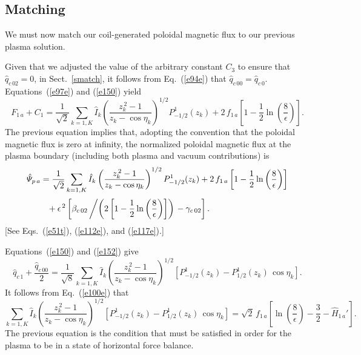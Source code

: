 \documentclass[12pt,prb,aps]{revtex4-1}
\begin{document}
\subsection{Matching}
We must now match our coil-generated poloidal magnetic flux to our previous plasma solution.

Given that we adjusted the
value of the arbitrary constant $C_3$ to ensure that $\hat{q}_{c\,02}=0$, in Sect.~\ref{smatch}, it follows from Eq.~(\ref{e94e})
that $\hat{q}_{c\,00}=\hat{q}_{c\,0}$.
Equations~(\ref{e97e}) and (\ref{e150}) yield 
\begin{equation}
F_{1\,a}+C_1 =\frac{1}{\sqrt{2}}\sum_{k=1,K}\hat{I}_k\left(\frac{z_k^{\,2}-1}{z_k-\cos\eta_k}\right)^{1/2}P_{-1/2}^1(z_k)
+2\,f_{1\,a}\left[1-\frac{1}{2}\ln\left(\frac{8}{\epsilon}\right)\right].
\end{equation}
The previous equation implies that, adopting the convention that the poloidal magnetic flux is zero at infinity, the normalized poloidal magnetic
flux at the plasma boundary (including both plasma and vacuum contributions) is
\begin{align}
\hat{\mit\Psi}_{p\,a} &= \frac{1}{\sqrt{2}}\sum_{k=1,K}\hat{I}_k\left(\frac{z_k^{\,2}-1}{z_k-\cos\eta_k}\right)^{1/2}P_{-1/2}^1(z_k)
+2\,f_{1\,a}\left[1-\frac{1}{2}\ln\left(\frac{8}{\epsilon}\right)\right]\nonumber\\[0.5ex]
&\phantom{=}+ \epsilon^{\,2}\left[\beta_{c\,02}\left/\left(2\left[1-\frac{1}{2}\ln\left(\frac{8}{\epsilon}\right)\right]\right)\right.-\gamma_{c\,02}\right].
\end{align}
[See Eqs.~(\ref{e51t}), (\ref{e112e}), and (\ref{e117e}).]

Equations~(\ref{e150}) and (\ref{e152}) give
\begin{equation}
\hat{q}_{c\,1}+ \frac{\hat{q}_{c\,00}}{2} = \frac{1}{\sqrt{8}}\sum_{k=1,K}\hat{I}_k\left(\frac{z_k^{\,2}-1}{z_k-\cos\eta_k}\right)^{1/2}\left[P_{-1/2}^1(z_k)
-P_{1/2}^1(z_k)\,\cos\eta_k\right].
\end{equation}
It follows from Eq.~(\ref{e100e}) that
\begin{equation}\label{e164}
\sum_{k=1,K}\hat{I}_k\left(\frac{z_k^{\,2}-1}{z_k-\cos\eta_k}\right)^{1/2}\left[P_{-1/2}^1(z_k)
-P_{1/2}^1(z_k)\,\cos\eta_k\right]=\sqrt{2}\,f_{1\,a}\left[\ln\left(\frac{8}{\epsilon}\right) -\frac{3}{2}-\hat{H}_{1\,a}'\right].
\end{equation}
The previous equation is the condition that must be satisfied in order for the plasma to be in a state of horizontal force balance. 
\end{document}
